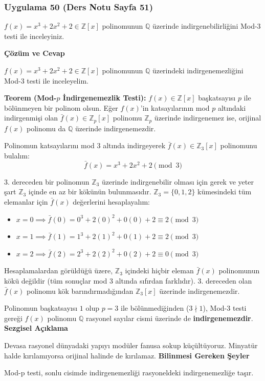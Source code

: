 \documentclass[11pt, a4paper]{article}
\newenvironment{cozum}{
    \vspace{0.5cm}
    \noindent\textcolor{green!60!black}{\faCheckCircle\enspace \textbf{\Large Çözüm ve Cevap}}\par\vspace{0.2cm}
}{}
\newenvironment{sezgisel}{
    \vspace{0.5cm}
    \noindent\textcolor{orange!80!black}{\faLightbulb\enspace \textbf{\Large Sezgisel Açıklama}}\par\vspace{0.2cm}
    \itshape
}{}
\newenvironment{bilgi}{
    \vspace{0.5cm}
    \noindent\textcolor{red!70!black}{\faExclamationTriangle\enspace \textbf{\Large Bilinmesi Gereken Şeyler}}\par\vspace{0.2cm}
}{}
\begin{document}
\newpage
\subsubsection{Uygulama 50 (Ders Notu Sayfa 51)}
\begin{sorubox}
$f(x)=x^3+2x^2+2 \in \mathbb{Z}[x]$ polinomunun $\mathbb{Q}$ üzerinde indirgenebilirliğini Mod-3 testi ile inceleyiniz.
\end{sorubox}
\begin{cozum}
$f(x) = x^{3} + 2x^{2} + 2 \in \mathbb{Z}[x]$ polinomunun $\mathbb{Q}$ üzerindeki indirgenemezliğini Mod-3 testi ile inceleyelim.

\textbf{Teorem (Mod-$p$ İndirgenemezlik Testi):} $f(x) \in \mathbb{Z}[x]$ başkatsayısı $p$ ile bölünmeyen bir polinom olsun. Eğer $f(x)$'in katsayılarının mod $p$ altındaki indirgenmişi olan $\bar{f}(x) \in \mathbb{Z}_p[x]$ polinomu $\mathbb{Z}_p$ üzerinde indirgenemez ise, orijinal $f(x)$ polinomu da $\mathbb{Q}$ üzerinde indirgenemezdir.

Polinomun katsayılarını mod 3 altında indirgeyerek $\bar{f}(x) \in \mathbb{Z}_{3}[x]$ polinomunu bulalım:
\[ \bar{f}(x) = x^{3} + 2x^{2} + 2 \pmod{3} \]

3. dereceden bir polinomun $\mathbb{Z}_{3}$ üzerinde indirgenebilir olması için gerek ve yeter şart $\mathbb{Z}_{3}$ içinde en az bir kökünün bulunmasıdır. $\mathbb{Z}_{3} = \{0, 1, 2\}$ kümesindeki tüm elemanlar için $\bar{f}(x)$ değerlerini hesaplayalım:
\begin{itemize}
    \item $x = 0 \implies \bar{f}(0) = 0^3 + 2(0)^2 + 0(0) + 2 \equiv 2 \pmod{3}$
    \item $x = 1 \implies \bar{f}(1) = 1^3 + 2(1)^2 + 0(1) + 2 \equiv 2 \pmod{3}$
    \item $x = 2 \implies \bar{f}(2) = 2^3 + 2(2)^2 + 0(2) + 2 \equiv 0 \pmod{3}$
\end{itemize}

Hesaplamalardan görüldüğü üzere, $\mathbb{Z}_{3}$ içindeki hiçbir eleman $\bar{f}(x)$ polinomunun kökü değildir (tüm sonuçlar mod 3 altında sıfırdan farklıdır). 3. dereceden olan $\bar{f}(x)$ polinomu kök barındırmadığından $\mathbb{Z}_{3}[x]$ üzerinde indirgenemezdir.

Polinomun başkatsayısı $1$ olup $p = 3$ ile bölünmediğinden ($3 \nmid 1$), Mod-3 testi gereği $f(x)$ polinomu $\mathbb{Q}$ rasyonel sayılar cismi üzerinde de \textbf{indirgenemezdir}.
\end{cozum}
\begin{sezgisel}
Devasa rasyonel dünyadaki yapıyı modüler fanusa sokup küçültüyoruz. Minyatür halde kırılamıyorsa orijinal halinde de kırılamaz.
\end{sezgisel}
\begin{bilgi}
Mod-p testi, sonlu cisimde indirgenemezliği rasyoneldeki indirgenemezliğe taşır.
\end{bilgi}
\end{document}
